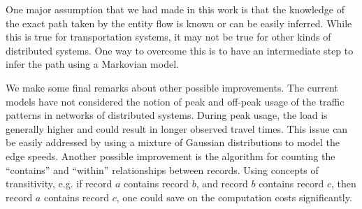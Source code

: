 \documentclass[conference]{IEEEtran.1.8}
\begin{document}
One major assumption that we had made in this work is that the knowledge of the exact path taken by the entity flow is known or can be easily inferred. While this is true for transportation systems, it may not be true for other kinds of distributed systems. One way to overcome this is to have an intermediate step to infer the path using a Markovian model. 

We make some final remarks about other possible improvements. The current models have not considered the notion of peak and off-peak usage of the traffic patterns in networks of distributed systems. During peak usage, the load is generally higher and could result in longer observed travel times. This issue can be easily addressed by using a mixture of Gaussian distributions to model the edge speeds. Another possible improvement is the algorithm for counting the ``contains'' and ``within'' relationships between records. Using concepts of transitivity, e.g. if record $a$ contains record $b$, and record $b$ contains record $c$, then record $a$ contains record $c$, one could save on the computation costs significantly.





\end{document}
